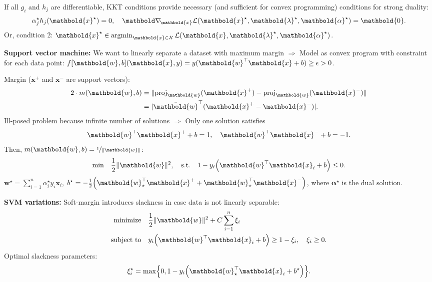 \documentclass[9pt]{extarticle}
\newenvironment{topic}[1]
{\textbf{\sffamily \colorbox{black}{\rlap{\textbf{\textcolor{white}{#1}}}\hspace{\linewidth}\hspace{-2\fboxsep}}}}
{}
\newenvironment{subtopic}[1]
{\textbf{\sffamily #1:}}
{}
\renewcommand{\vec}[1]{\ensuremath{\mathbold{#1}}}
\begin{document}
\begin{multicols*}{3}
\begin{topic}{Convex optimization and SVMs}
        If all $g_i$ and $h_j$ are differentiable, KKT conditions provide necessary (and sufficient for
        convex programming) conditions for strong duality: \[
            \alpha_j^\star h_j(\vec{x}^\star) = 0, \quad \grad{\mathcal{L}(\vec{x}^\star, \vec{\lambda}^\star, \vec{\alpha}^\star)}{\vec{x}} = \vec{0}.
        \]
        Or, condition 2: $\vec{x}^\star \in \argmin_{\vec{x} \in \mathcal{X}} \mathcal{L}(\vec{x},
            \vec{\lambda}^\star, \vec{\alpha}^\star)$.

        \begin{subtopic}{Support vector machine}
            We want to linearly separate a dataset with maximum margin $\Rightarrow$ Model as convex program
            with constraint for each data point: $f[\vec{w},b](\vec{x},y) = y (\transpose{\vec{w}}\vec{x} + b) \geq \epsilon > 0$.

            Margin ($\vec{x}^+$ and $\vec{x}^-$ are support vectors):
            \begin{align*}
                2 \cdot m(\vec{w},b) & = \| \mathrm{proj}_{\vec{w}}(\vec{x}^+) - \mathrm{proj}_{\vec{w}}(\vec{x}^-) \| \\
                                     & = |\transpose{\bar{\vec{w}}} (\vec{x}^+ - \vec{x}^-)|.
            \end{align*}
            Ill-posed problem because infinite number of solutions $\Rightarrow$ Only one solution satisfies \[
                \transpose{\vec{w}} \vec{x}^+ +b = 1, \quad \transpose{\vec{w}} \vec{x}^- + b = -1.
            \]
            Then, $m(\vec{w},b) = \nicefrac{1}{\| \vec{w} \|}$: \[
                \text{min} \quad \frac{1}{2} \| \vec{w} \|^2, \quad \text{s.t.} \quad 1 - y_i \lft( \transpose{\vec{w}}\vec{x}_i + b \rgt) \leq 0.
            \]
            $\vec{w}^\star = \sum_{i=1}^{n} \alpha^\star_i y_i \vec{x}_i$, $b^\star = -\frac{1}{2} \lft( \transpose{\vec{w}_{\star}} \vec{x}^+ + \transpose{\vec{w}_{\star}} \vec{x}^- \rgt)$,
            where $\vec{\alpha}^\star$ is the dual solution.

        \end{subtopic}

        \begin{subtopic}{SVM variations}
            Soft-margin introduces slackness in case data is not linearly separable:
            \begin{align*}
                \text{minimize}   & \quad \frac{1}{2} \| \vec{w} \|^2 + C \sum_{i=1}^{n} \xi_i                                \\
                \text{subject to} & \quad y_i \lft(\transpose{\vec{w}} \vec{x}_i +b \rgt) \geq 1 - \xi_i, \quad \xi_i \geq 0.
            \end{align*}
            Optimal slackness parameters: \[
                \xi_i^\star = \max \lft\{ 0, 1 - y_i \lft(\transpose{\vec{w}_{\star}} \vec{x}_i + b^\star\rgt) \rgt\}.
            \]


\end{subtopic}
\end{topic}
\end{multicols*}
\end{document}
